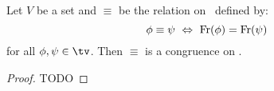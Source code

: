 \begin{prop}\label{logic:prop:LAM:congruence:freevar}
Let $V$ be a set and $\equiv$ be the relation on \tv\ defined by:
    \[
    \phi\equiv\psi\ \Leftrightarrow\ \free(\phi)=\free(\psi)
    \]
for all $\phi,\psi\in\tv$. Then $\equiv$ is a congruence on \tv.
\end{prop}
\begin{proof}
TODO
\end{proof}



